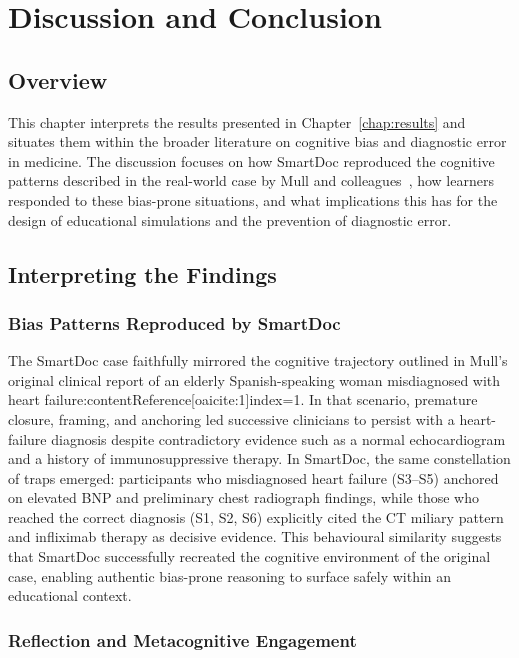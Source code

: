 \chapter{Discussion and Conclusion}
\label{chap:ch6}

\section{Overview}

This chapter interprets the results presented in Chapter~\ref{chap:results}
and situates them within the broader literature on cognitive bias and diagnostic
error in medicine.  
The discussion focuses on how SmartDoc reproduced the cognitive patterns described
in the real-world case by Mull and colleagues~\parencite{mull_cognitive_2015},
how learners responded to these bias-prone situations, and what implications
this has for the design of educational simulations and the prevention of diagnostic
error.

\section{Interpreting the Findings}

\subsection{Bias Patterns Reproduced by SmartDoc}

The SmartDoc case faithfully mirrored the cognitive trajectory outlined in
Mull’s original clinical report of an elderly Spanish-speaking woman misdiagnosed
with heart failure:contentReference[oaicite:1]{index=1}.  
In that scenario, premature closure, framing, and anchoring led successive clinicians
to persist with a heart-failure diagnosis despite contradictory evidence such as a
normal echocardiogram and a history of immunosuppressive therapy.  
In SmartDoc, the same constellation of traps emerged:
participants who misdiagnosed heart failure (S3–S5) anchored on elevated BNP
and preliminary chest radiograph findings, while those who reached the correct
diagnosis (S1, S2, S6) explicitly cited the CT miliary pattern and infliximab therapy
as decisive evidence.  
This behavioural similarity suggests that SmartDoc successfully recreated the
cognitive environment of the original case, enabling authentic bias-prone reasoning
to surface safely within an educational context.

\subsection{Reflection and Metacognitive Engagement}

